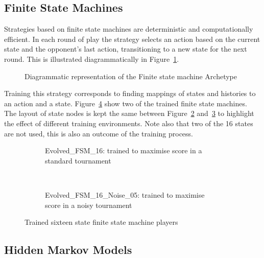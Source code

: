 \documentclass{article}
\begin{document}
\subsection{Finite State Machines}\label{sec:fsm}

Strategies based on finite state machines are deterministic and computationally efficient.
In each round of play the strategy selects an action based on the current state
and the opponent's last action, transitioning to a new state for the next round.
This is illustrated diagrammatically in Figure~\ref{fig:fsm}.

\begin{figure}[!hbtp]
    \centering
    
    \caption{Diagrammatic representation of the Finite state machine Archetype}
    \label{fig:fsm}
\end{figure}

Training this strategy corresponds to finding mappings of states and histories
to an action and a state. Figure~\ref{fig:fsm_images} show two of the trained
finite state machines. The layout of state nodes is kept the same between
Figure~\ref{fig:fsm16} and~\ref{fig:fsm16noise} to highlight the effect of
different training environments. Note also that two of the 16 states are not
used, this is also an outcome of the training process.


\begin{figure}[!hbtp]
    \centering
    \begin{subfigure}[t]{.5\textwidth}
        
        \caption{Evolved\_FSM\_16: trained to maximise score in a standard
        tournament}
        \label{fig:fsm16}
    \end{subfigure}%
    ~
    \begin{subfigure}[t]{.5\textwidth}
        \centering
        
        \caption{Evolved\_FSM\_16\_Noise\_05: trained to maximise score in a
        noisy tournament}
        \label{fig:fsm16noise}
    \end{subfigure}%
    \caption{Trained sixteen state finite state machine players}
    \label{fig:fsm_images}
\end{figure}


\subsection{Hidden Markov Models}
\end{document}
